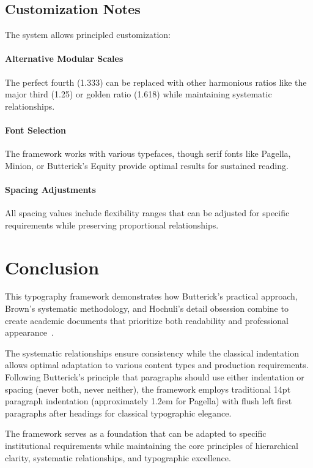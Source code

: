 \documentclass[11pt]{article}
\begin{document}
\subsection{Customization Notes}

The system allows principled customization:

\paragraph{Alternative Modular Scales} The perfect fourth (1.333) can be replaced with other harmonious ratios like the major third (1.25) or golden ratio (1.618) while maintaining systematic relationships.

\paragraph{Font Selection} The framework works with various typefaces, though serif fonts like Pagella, Minion, or Butterick's Equity provide optimal results for sustained reading.

\paragraph{Spacing Adjustments} All spacing values include flexibility ranges that can be adjusted for specific requirements while preserving proportional relationships.

\section{Conclusion}

This typography framework demonstrates how Butterick's practical approach, Brown's systematic methodology, and Hochuli's detail obsession combine to create academic documents that prioritize both readability and professional appearance~\parencite{butterick2019practical, brown2018flexible, hochuli1987detail}. 

The systematic relationships ensure consistency while the classical indentation allows optimal adaptation to various content types and production requirements. Following Butterick's principle that paragraphs should use either indentation or spacing (never both, never neither), the framework employs traditional 14pt paragraph indentation (approximately 1.2em for Pagella) with flush left first paragraphs after headings for classical typographic elegance.

The framework serves as a foundation that can be adapted to specific institutional requirements while maintaining the core principles of hierarchical clarity, systematic relationships, and typographic excellence.
\end{document}
